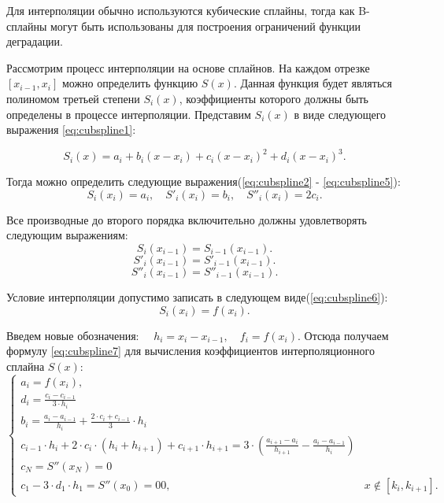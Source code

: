 Для интерполяции обычно используются кубические сплайны, тогда как B-сплайны могут быть использованы для построения ограничений функции деградации.

Рассмотрим процесс интерполяции на основе сплайнов.
На каждом отрезке $[x_{i - 1},x_{i}]$ можно определить функцию $S(x)$.
Данная функция будет являться полиномом третьей степени $S_i(x)$, коэффициенты которого должны быть определены в процессе интерполяции. 
Представим $S_i(x)$ в виде следующего выражения \ref{eq:cubspline1}:

\begin{equation} \label{eq:cubspline1}
    S_i(x) = a_i + b_i(x - x_i) + {c_i}(x-x_i)^2 + {d_i}(x - x_i)^3.
\end{equation}

Тогда можно определить следующие выражения(\ref{eq:cubspline2} - \ref{eq:cubspline5}):
\begin{equation} \label{eq:cubspline2}
    S_i\left(x_i\right) = a_i, \quad S'_i(x_i) = b_i, \quad S''_i(x_i) = 2c_i.
\end{equation}

Все производные до второго порядка включительно должны удовлетворять следующим выражениям:
\begin{equation} \label{eq:cubspline3}
    S_i\left(x_{i-1}\right) = S_{i-1}(x_{i-1}).
\end{equation}
\begin{equation} \label{eq:cubspline4}
    S'_i\left(x_{i-1}\right) = S'_{i-1}(x_{i-1}).
\end{equation}
\begin{equation} \label{eq:cubspline5}
    S''_i\left(x_{i-1}\right) = S''_{i-1}(x_{i-1}).
\end{equation}

Условие интерполяции допустимо записать в следующем виде(\ref{eq:cubspline6}):
\begin{equation} \label{eq:cubspline6}
    S_i\left(x_{i}\right) = f(x_{i}).
\end{equation}

Введем новые обозначения: $\quad h_i = x_i - x_{i-1}, \quad f_{i} = f(x_{i})$. 
Отсюда получаем формулу \ref{eq:cubspline7} для вычисления коэффициентов интерполяционного сплайна $S(x)$:
\begin{equation} \label{eq:cubspline7}
\begin{cases} 
a_{i} = f(x_{i}), \\ 
d_{i} = \frac{c_{i} - c_{i - 1}}{3 \cdot h_{i}} \\
b_{i} = \frac{a_{i} - a_{i - 1}}{h_{i}} + \frac{2 \cdot c_{i} + c_{i - 1}}{3} \cdot h_{i} \\
c_{i - 1} \cdot h_{i} + 2 \cdot c_{i} \cdot(h_{i} + h_{i+1}) + c_{i + 1} \cdot h_{i+1} = 3 \cdot \left(\frac{a_{i+1} - a_{i}}{h_{i+1}} - \frac{a_{i} - a_{i - 1}}{h_{i}}\right) \\
c_{N} = S''(x_{N}) = 0 \\
c_{1} - 3 \cdot d_{1} \cdot h_{1} = S''(x_{0}) = 0
0, & x \notin [k_i,k_{i+1}].
\end{cases}
\end{equation}

